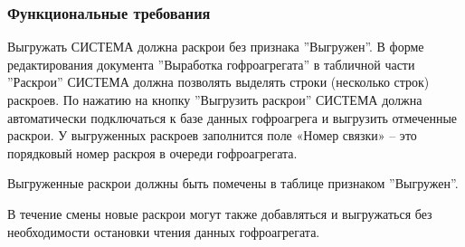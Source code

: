 \subsubsection{Функциональные требования}


Выгружать СИСТЕМА должна раскрои без признака ''Выгружен''. В форме редактирования документа ''Выработка гофроагрегата'' в табличной части ''Раскрои'' СИСТЕМА должна позволять выделять строки (несколько строк) раскроев. 
По нажатию на кнопку ''Выгрузить раскрои'' СИСТЕМА должна 
автоматически подключаться к базе данных гофроагрега и выгрузить отмеченные раскрои. У выгруженных раскроев заполнится поле «Номер связки» – это порядковый номер раскроя в очереди гофроагрегата. 


Выгруженные раскрои должны быть помечены в таблице  признаком ''Выгружен''. 

В течение смены новые раскрои могут также добавляться и выгружаться без необходимости остановки чтения данных гофроагрегата.


